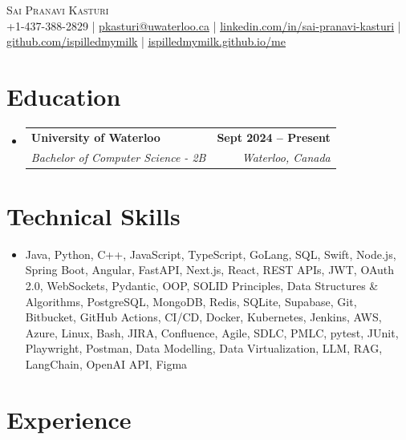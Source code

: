 \documentclass[letterpaper,10pt]{article}
\makeatletter
\newcommand{\resumeSubheading}[4]{
  \vspace{-1pt}\item
    \begin{tabular*}{1.0\textwidth}[t]{l@{\extracolsep{\fill}}r}
      \textbf{#1} & \textbf{\small #2} \\
      \textit{\small#3} & \textit{\small #4} \\[-2pt]
    \end{tabular*}\vspace{-7pt}
}
\newcommand{\resumeSubHeadingListStart}{\begin{itemize}[leftmargin=0.0in, label={}]}
\newcommand{\resumeSubHeadingListEnd}{\end{itemize}}
\makeatother
\begin{document}

\vspace{-28pt}
\begin{center}
    {\Huge \scshape Sai Pranavi Kasturi} \\ 
    
    \small +1-437-388-2829 | \underline{pkasturi@uwaterloo.ca} | \href{https://linkedin.com/in/sai-pranavi-kasturi-704807298}{\underline{linkedin.com/in/sai-pranavi-kasturi}} | \href{https://github.com/ispilledmymilk}{\underline{github.com/ispilledmymilk}} | \href{https://ispilledmymilk.github.io/me/}{\underline{ispilledmymilk.github.io/me}}
    \vspace{-10pt}
\end{center}

\vspace{-10pt}
\section{Education}
  \resumeSubHeadingListStart
    \resumeSubheading
      {University of Waterloo}{Sept 2024 -- Present}
      {Bachelor of Computer Science - 2B}{Waterloo, Canada}
  \resumeSubHeadingListEnd
\vspace{-8pt}
  

\section{Technical Skills}
\begin{itemize}[leftmargin=0.05in, label={}]
  \small\item{
    Java, Python, C++, JavaScript, TypeScript, GoLang, SQL, Swift, Node.js, Spring Boot, Angular, FastAPI, Next.js, React, REST APIs, JWT, OAuth 2.0, WebSockets, Pydantic, OOP, SOLID Principles, Data Structures \& Algorithms, PostgreSQL, MongoDB, Redis, SQLite, Supabase, Git, Bitbucket, GitHub Actions, CI/CD, Docker, Kubernetes, Jenkins, AWS, Azure, Linux, Bash, JIRA, Confluence, Agile, SDLC, PMLC, pytest, JUnit, Playwright, Postman, Data Modelling, Data Virtualization, LLM, RAG, LangChain, OpenAI API, Figma
  }
\end{itemize}
 \vspace{-18pt}

\vspace{1.20pt}
\section{Experience}
\end{document}
